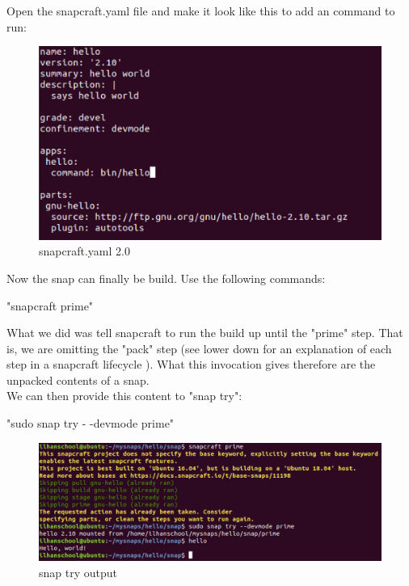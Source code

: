 \documentclass{article}
\begin{document}
\begin{flushleft}
\begin{flushleft}
Open the snapcraft.yaml file and make it look like this to add an command to run:
\label{fig:step8}	
	\begin{figure}[H]
	\includegraphics[width=5in]{step8.png}
	\caption[Optional caption]{snapcraft.yaml 2.0}
	\end{figure}
Now the snap can finally be build. Use the following commands: 
			\begin{center}	
			"snapcraft prime"\\ 
			\end{center}
			
What we did was tell snapcraft to run the build up until the "prime" step. That is, we are
omitting the "pack" step (see lower down for an explanation of each step in a snapcraft
lifecycle \pageref{ref:snaplife}). What this invocation gives therefore are the unpacked contents of a snap.\\

We can then provide this content to "snap try":
			\begin{center}	
			"sudo snap try - -devmode prime"\\ 
			\end{center}
\label{fig:step9}	
	\begin{figure}[H]
	\includegraphics[width=5in]{step9.png}
	\caption[Optional caption]{snap try output}
	\end{figure}


\end{flushleft}
\end{flushleft}
\end{document}
